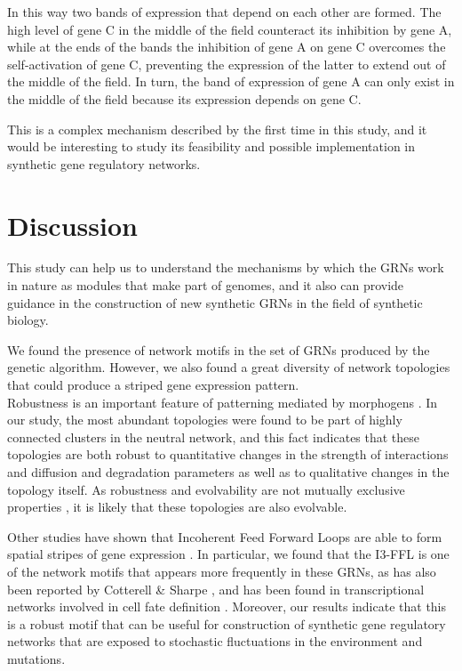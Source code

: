 \documentclass[10pt,letterpaper]{article}
\begin{document}

In this way two bands of expression that depend on each other are formed. The
high level of gene C in the middle of the field counteract its inhibition by
gene A, while at the ends of the bands the inhibition of gene A on gene C
overcomes the self-activation of gene C, preventing the expression of the
latter to extend out of the middle of the field. In turn, the band of
expression of gene A can only exist in the middle of the field because its
expression depends on gene C.

This is a complex mechanism described by the first time in this study, and it
would be interesting to study its feasibility and possible implementation in
synthetic gene regulatory networks.

\section*{Discussion}

This study can help us to understand the mechanisms by which the GRNs work in
nature as modules that make part of genomes, and it also can provide guidance
in the construction of new synthetic GRNs in the field of synthetic biology.

We found the presence of network motifs in the set of GRNs produced by the
genetic algorithm. However, we also found a great diversity of network
topologies that could produce a striped gene expression pattern.\\

Robustness is an important feature of patterning mediated by morphogens
\cite{lo_robust_2015}. In our study, the most abundant topologies were found to
be part of highly connected clusters in the neutral network, and this fact
indicates that these topologies are both robust to quantitative changes in the
strength of interactions and diffusion and degradation parameters as well as to
qualitative changes in the topology itself. As robustness and evolvability are
not mutually exclusive properties \cite{wagner_robustness_2008}, it is likely
that these topologies are also evolvable.

Other studies have shown that Incoherent Feed Forward Loops are able to form
spatial stripes of gene expression \cite{ishihara_cross_2005}. In particular,
we found that the I3-FFL is one of the network motifs that appears more
frequently in these GRNs, as has also been reported by Cotterell \& Sharpe
\cite{Cotterell2010}, and has been found in transcriptional networks involved
in cell fate definition \cite{Li2019}. Moreover, our results indicate that this
is a robust motif that can be useful for construction of synthetic gene
regulatory networks that are exposed to stochastic fluctuations in the
environment and mutations.
\end{document}
